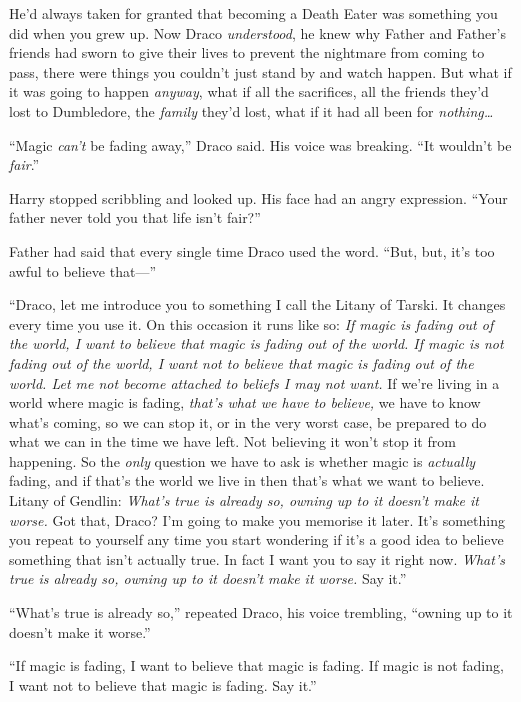 He'd always taken for granted that becoming a Death Eater was something
you did when you grew up. Now Draco \emph{understood}, he knew why
Father and Father's friends had sworn to give their lives to prevent the
nightmare from coming to pass, there were things you couldn't just stand
by and watch happen. But what if it was going to happen \emph{anyway},
what if all the sacrifices, all the friends they'd lost to Dumbledore,
the \emph{family} they'd lost, what if it had all been for
\emph{nothing\ldots{}}

``Magic \emph{can't} be fading away,'' Draco said. His voice was
breaking. ``It wouldn't be \emph{fair}.''

Harry stopped scribbling and looked up. His face had an angry
expression. ``Your father never told you that life isn't fair?''

Father had said that every single time Draco used the word. ``But, but,
it's too awful to believe that---''

``Draco, let me introduce you to something I call the Litany of Tarski.
It changes every time you use it. On this occasion it runs like so:
\emph{If magic is fading out of the world, I want to believe that magic
is fading out of the world. If magic is not fading out of the world, I
want not to believe that magic is fading out of the world. Let me not
become attached to beliefs I may not want.} If we're living in a world
where magic is fading, \emph{that's what we have to believe,} we have to
know what's coming, so we can stop it, or in the very worst case, be
prepared to do what we can in the time we have left. Not believing it
won't stop it from happening. So the \emph{only} question we have to ask
is whether magic is \emph{actually} fading, and if that's the world we
live in then that's what we want to believe. Litany of Gendlin:
\emph{What's true is already so, owning up to it doesn't make it worse.}
Got that, Draco? I'm going to make you memorise it later. It's something
you repeat to yourself any time you start wondering if it's a good idea
to believe something that isn't actually true. In fact I want you to say
it right now. \emph{What's true is already so, owning up to it doesn't
make it worse.} Say it.''

``What's true is already so,'' repeated Draco, his voice trembling,
``owning up to it doesn't make it worse.''

``If magic is fading, I want to believe that magic is fading. If magic
is not fading, I want not to believe that magic is fading. Say it.''

